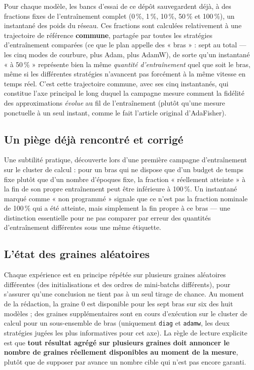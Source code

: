 \documentclass[11pt,a4paper]{article}
\begin{document}
Pour chaque modèle, les bancs d'essai de ce dépôt sauvegardent déjà, à des fractions fixes de
l'entraînement complet (0\,\%, 1\,\%, 10\,\%, 50\,\% et 100\,\%), un instantané des poids du réseau.
Ces fractions sont calculées relativement à une trajectoire de référence \textbf{commune}, partagée
par toutes les stratégies d'entraînement comparées (ce que le plan appelle des « bras » : sept au
total — les cinq modes de courbure, plus Adam, plus AdamW), de sorte qu'un instantané « à 50\,\% »
représente bien la même \emph{quantité d'entraînement} quel que soit le bras, même si les
différentes stratégies n'avancent pas forcément à la même vitesse en temps réel. C'est cette
trajectoire commune, avec ses cinq instantanés, qui constitue l'axe principal le long duquel la
campagne mesure comment la fidélité des approximations \emph{évolue} au fil de l'entraînement
(plutôt qu'une mesure ponctuelle à un seul instant, comme le fait l'article original d'AdaFisher).

\subsection{Un piège déjà rencontré et corrigé}

Une subtilité pratique, découverte lors d'une première campagne d'entraînement sur le cluster de
calcul : pour un bras qui ne dispose que d'un budget de temps fixe plutôt que d'un nombre d'époques
fixe, la fraction « réellement atteinte » à la fin de son propre entraînement peut être inférieure à
100\,\%. Un instantané marqué comme « non programmé » signale que ce n'est pas la fraction nominale
de 100\,\% qui a été atteinte, mais simplement la fin propre à ce bras — une distinction essentielle
pour ne pas comparer par erreur des quantités d'entraînement différentes sous une même étiquette.

\subsection{L'état des graines aléatoires}

Chaque expérience est en principe répétée sur plusieurs graines aléatoires différentes (des
initialisations et des ordres de mini-batchs différents), pour s'assurer qu'une conclusion ne tient
pas à un seul tirage de chance. Au moment de la rédaction, la graine 0 est disponible pour les sept
bras sur six des huit modèles ; des graines supplémentaires sont en cours d'exécution sur le
cluster de calcul pour un sous-ensemble de bras (uniquement \texttt{diag} et \texttt{adamw}, les
deux stratégies jugées les plus informatives pour cet axe). La règle de lecture explicite est que
\textbf{tout résultat agrégé sur plusieurs graines doit annoncer le nombre de graines réellement
disponibles au moment de la mesure}, plutôt que de supposer par avance un nombre cible qui n'est pas
encore garanti.
\end{document}
